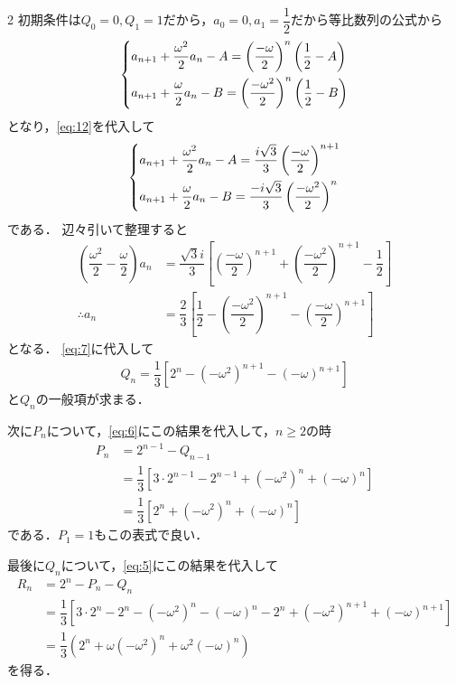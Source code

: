 \documentclass[../../main.tex]{subfiles}
\begin{document}
\begin{multicols}{2}
  初期条件は$Q_0=0, Q_1=1$だから，$a_0=0, a_1=\dfrac{1}{2}$だから等比数列の公式から
  \begin{align}
    \begin{dcases}
      a_{n+1} + \dfrac{\omega^2}{2}a_n - A = \left(\dfrac{-\omega}{2}\right)^n  \left(\dfrac{1}{2}-A\right) \\
      a_{n+1} + \dfrac{\omega}{2}a_n - B   = \left(\dfrac{-\omega^2}{2}\right)^n\left(\dfrac{1}{2}-B\right)
    \end{dcases}
  \end{align}
  となり，\cref{eq:12}を代入して
  \begin{align}
    \begin{dcases}
      a_{n+1} + \dfrac{\omega^2}{2}a_n - A = \dfrac{i\sqrt{3}}{3}\left(\dfrac{-\omega}{2}\right)^{n+1} \\
      a_{n+1} + \dfrac{\omega}{2}a_n - B   = \dfrac{-i\sqrt{3}}{3}\left(\dfrac{-\omega^2}{2}\right)^n
    \end{dcases}
  \end{align}
  である．
  辺々引いて整理すると
  \begin{align}
    \left(\dfrac{\omega^2}{2} - \dfrac{\omega}{2}\right)a_n
    & = \dfrac{\sqrt{3}i}{3}\left[\left(\dfrac{-\omega}{2}\right)^{n+1} + \left(\dfrac{-\omega^2}{2}\right)^{n+1} - \dfrac{1}{2}\right] \\
    \therefore
    a_n
    & = \dfrac{2}{3}\left[\dfrac{1}{2} - \left(\dfrac{-\omega^2}{2}\right)^{n+1} - \left(\dfrac{-\omega}{2}\right)^{n+1}\right]
  \end{align}
  となる．
  \cref{eq:7}に代入して
  \begin{align}
    Q_n = \dfrac{1}{3}\left[2^n - (-\omega^2)^{n+1} - (-\omega)^{n+1}\right] \label{eq:13}
  \end{align}
  と$Q_n$の一般項が求まる．

  次に$P_n$について，\cref{eq:6}にこの結果を代入して，$n \ge 2$の時
  \begin{align}
    P_n & = 2^{n-1} - Q_{n-1}                                                               \\
    & = \dfrac{1}{3}\left[3 \cdot 2^{n-1} - 2^{n-1} + (-\omega^2)^n + (-\omega)^n\right] \\
    & = \dfrac{1}{3}\left[2^n + (-\omega^2)^n + (-\omega)^n\right]
  \end{align}
  である．$P_1=1$もこの表式で良い．

  最後に$Q_n$について，\cref{eq:5}にこの結果を代入して
  \begin{align}
    R_n & = 2^n - P_n - Q_n                                                                                                     \\
    & = \dfrac{1}{3}\left[3 \cdot 2^n - 2^n - (-\omega^2)^n - (-\omega)^n - 2^n + (-\omega^2)^{n+1} + (-\omega)^{n+1}\right] \\
    & = \dfrac{1}{3}\left(2^n + \omega(-\omega^2)^n + \omega^2(-\omega)^n\right)
  \end{align}
  を得る．


\end{multicols}
\end{document}
